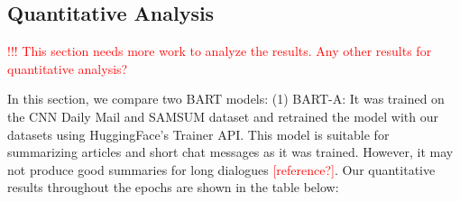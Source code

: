 


\subsection{Quantitative Analysis}

\textcolor{red}{!!! This section needs more work to analyze the results. Any other results for quantitative analysis?}

In this section, we compare two BART models: (1) BART-A: It was trained on the CNN Daily Mail and SAMSUM dataset and retrained the model with our datasets using HuggingFace's Trainer API. This model is suitable for summarizing articles and short chat messages as it was trained. However, it may not produce good summaries for long dialogues \textcolor{red}{[reference?]}. Our quantitative results throughout the epochs are shown in the table below:



%


